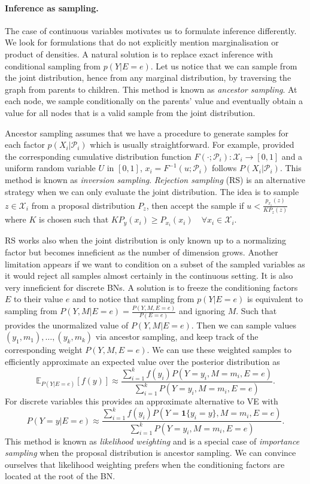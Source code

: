 \paragraph{Inference as sampling.}
The case of continuous variables motivates us to formulate inference differently. We look for formulations that do not explicitly mention marginalisation or product of densities. A natural solution is to replace exact inference with conditional sampling from $p(Y|E=e)$. Let us notice that we can sample from the joint distribution, hence from any marginal distribution, by traversing the graph from parents to children. This method is known as \textit{ancestor sampling}. At each node, we sample conditionally on the parents' value and eventually obtain a value for all nodes that is a valid sample from the joint distribution.

Ancestor sampling assumes that we have a procedure to generate samples for each factor $p(X_i|\mathcal{P}_i)$ which is usually straightforward. For example, provided the corresponding cumulative distribution function $F(\cdot;\mathcal{P}_i): \mathcal{X}_i \rightarrow \left[0, 1 \right]$ and a uniform random variable $U$ in $\left[0, 1\right]$, $x_i=F^{-1}(u;\mathcal{P}_i)$ follows $P(X_i|\mathcal{P}_i)$. This method is known as \textit{inversion sampling}. \textit{Rejection sampling} (RS) is an alternative strategy when we can only evaluate the joint distribution. The idea is to sample $z \in \mathcal{X}_i$ from a proposal distribution $P_z$, then accept the sample if $u< \frac{p_{x_i}(z)}{K P_z(z)} $ where $K$ is chosen such that $ K P_y(x_i) \geq P_{x_i}(x_i) \quad \forall x_i \in \mathcal{X}_i$.

RS works also when the joint distribution is only known up to a normalizing factor but becomes inneficient as the number of dimension grows. Another limitation appears if we want to condition on a subset of the sampled variables as it would reject all samples almost certainly in the continuous setting. It is also very inneficient for discrete BNs. A solution is to freeze the conditioning factors $E$ to their value $e$ and to notice that sampling from $p(Y|E=e)$ is equivalent to sampling from $P(Y, M|E=e) = \frac{P(Y, M, E=e)}{P(E=e)}$ and ignoring $M$. Such that  provides the unormalized value of $P(Y, M|E=e)$. Then we can sample values $(y_1, m_1), \dots, (y_k, m_k)$ via ancestor sampling, and keep track of the corresponding weight $P(Y, M, E=e)$. We can use these weighted samples to efficiently approximate an expected value over the posterior distribution as
$$ \mathbb{E}_{P(Y|E=e)}\left[f(y)\right] \approx \frac{\sum_{i=1}^k f(y_i) P(Y=y_i, M=m_i, E=e)}{\sum_{i=1}^k P(Y=y_i, M=m_i, E=e) }.$$ For discrete variables this provides an approximate alternative to VE with $$P(Y=y|E=e) \approx \frac{\sum_{i=1}^k f(y_i) P(Y=\bm{1}\{y_i = y\}, M=m_i, E=e)}{\sum_{i=1}^k P(Y=y_i, M=m_i, E=e)}. $$ This method is known as \textit{likelihood weighting} and is a special case of \textit{importance sampling} when the proposal distribution is ancestor sampling. We can convince ourselves that likelihood weighting prefers when the conditioning factors are located at the root of the BN.

